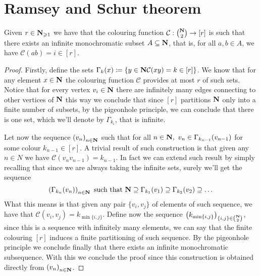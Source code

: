 \section{Ramsey and Schur theorem}

\begin{theorem}\label{ramseyThmGraphs}
Given \(r \in \mathbf{N}_{\geqslant 1}\) we have that the colouring function
\(\mathcal{C}: \binom{\mathbf{N}}{2} \to [r]\) is such that there exists an
infinite monochromatic subset \(A \subseteq \mathbf{N}\), that is, for all \(a, b
\in A\), we have \(\mathcal{C}(ab) = i \in [r]\).
\end{theorem}

\begin{proof}
Firstly, define the sets \(\Gamma_k(x) \coloneq \{y \in \mathbf{N} \relax \mathcal{C}(x
y) = k \in [r]\}\). We know that for any element \(x \in \mathbf{N}\) the
colouring function \(\mathcal{C}\) provides at most \(r\) of such sets. Notice
that for every vertex \(v_i \in \mathbf{N}\) there are infinitely many edges
connecting to other vertices of \(\mathbf{N}\) this way we conclude that
since \([r]\) partitions \(\mathbf{N}\) only into a finite number of subsets,
by the pigeonhole principle, we can conclude that there is one set, which
we'll denote by \(\Gamma_{k_i}\), that is infinite.

Let now the sequence \(\left( v_n \right)_{n \in \mathbf{N}}\) such that for all
\(n \in \N,\ v_n \in \Gamma_{k_{n-1}}(v_{n-1})\) for some
colour \(k_{n-1} \in [r]\). A trivial result of such construction is that
given any \(n \in N\) we have \(\mathcal{C}(v_n v_{n-1}) = k_{n-1}\). In fact
we can extend such result by simply recalling that since we are always taking
the infinite sets, surely we'll get the sequence
\[
    \left( \Gamma_{k_{n}}(v_n) \right)_{n \in \mathbf{N}} \text{ such that }
    \mathbf{N} \supseteq \Gamma_{k_{1}}(v_1) \supseteq  \Gamma_{k_{2}}(v_2)
    \supseteq \dots
\]
What this means is that given any pair \(\{v_i, v_j\}\) of elements of such
sequence, we have that \(\mathcal{C}(v_i, v_j) = k_{\min \{i, j\}}\). Define
now the sequence \(\left( k_{\min \{i, j\}} \right)_{\{i, j\} \in
\binom{\mathbf{N}}{2}}\), since this is a sequence with infinitely many
elements, we can say that the finite colouring \([r]\) induces a finite
partitioning of such sequence. By the pigeonhole principle we conclude
finally that there exists an infinite monochromatic subsequence. With this we
conclude the proof since this construction is obtained directly from \(\left(
v_n \right)_{n \in \mathbf{N}}\).
\end{proof}

